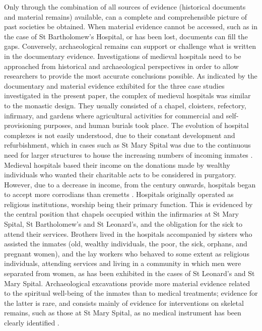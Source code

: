 \documentclass[%
	]{ijsra}
\renewcommand\AD{\xspace}
\begin{document}
\IJSRAseparator
{}
Only through the combination of all sources of evidence (historical documents and material remains) available, can a complete and comprehensible picture of past societies be obtained. When material evidence cannot be accessed, such as in the case of St Bartholomew’s Hospital, or has been lost, documents can fill the gaps. Conversely, archaeological remains can support or challenge what is written in the documentary evidence. Investigations of medieval hospitals need to be approached from historical and archaeological perspectives in order to allow researchers to provide the most accurate conclusions possible. 
As indicated by the documentary and material evidence exhibited for the three case studies investigated in the present paper, the complex of medieval hospitals was similar to the monastic design. They usually consisted of a chapel, cloisters, refectory, infirmary, and gardens where agricultural activities for commercial and self-provisioning purposes, and human burials took place. 
The evolution of hospital complexes is not easily understood, due to their constant development and refurbishment, which in cases such as St Mary Spital was due to the continuous need for larger structures to house the increasing numbers of incoming inmates \parencites[69,117-118]{Henderson_2006}[27]{Malcom_2014}[41,43]{Orme_1995}[35]{Rawcliffe_1999}.
Medieval hospitals based their income on the donations made by wealthy individuals who wanted their charitable acts to be considered in purgatory. However, due to a decrease in income, from the  century\AD onwards, hospitals began to accept more corrodians than cremetts \parencites[69]{Dean_2008}[207]{Malcom_2014}. 
Hospitals originally operated as religious institutions, worship being their primary function. This is evidenced by the central position that chapels occupied within the infirmaries at St Mary Spital, St Bartholomew’s and St Leonard’s, and the obligation for the sick to attend their services. Brothers lived in the hospitals accompanied by sisters who assisted the inmates (old, wealthy individuals, the poor, the sick, orphans, and pregnant women), and the lay workers who behaved to some extent as religious individuals, attending services and living in a community in which men were separated from women, as has been exhibited in the cases of St Leonard’s and St Mary Spital. 
Archaeological excavations provide more material evidence related to the spiritual well-being of the inmates than to medical treatments; evidence for the latter is rare, and consists mainly of evidence for interventions on skeletal remains, such as those at St Mary Spital, as no medical instrument has been clearly identified \parencite[65,76]{Bowers_2007}. 
\end{document}
